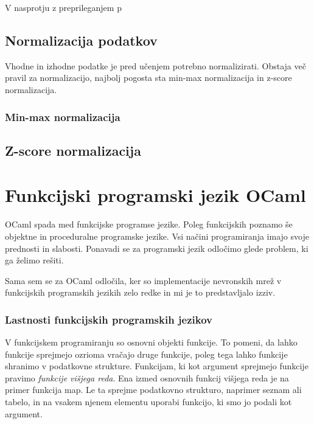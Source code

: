 \documentclass[mat1]{fmfdelo}
\begin{document}
V nasprotju z preprileganjem p
%
%
%
\subsection{Normalizacija podatkov}
Vhodne in izhodne podatke je pred učenjem potrebno normalizirati. Obstaja več pravil za normalizacijo, najbolj pogosta sta min-max normalizacija in z-score normalizacija.
%
\subsubsection{Min-max normalizacija}

%
\subsection{Z-score normalizacija}
%
\section{Funkcijski programski jezik OCaml}
OCaml spada med funkcijske programse jezike. Poleg funkcijskih poznamo še objektne in proceduralne programske jezike. Vsi načini programiranja imajo svoje prednosti in slabosti. Ponavadi se za programski jezik odločimo glede problem, ki ga želimo rešiti. 

Sama sem se za OCaml odločila, ker so implementacije nevronskih mrež v funkcijskih programskih jezikih zelo redke in mi je to predstavljalo izziv. 
%
\subsubsection{Lastnosti funkcijskih programskih jezikov}
V funkcijskem programiranju so osnovni objekti funkcije. To pomeni, da lahko funkcije sprejmejo ozrioma vračajo druge funkcije, poleg tega lahko funkcije shranimo v podatkovne strukture. Funkcijam, ki kot argument sprejmejo funkcije pravimo \emph{funkcije višjega reda}. Ena izmed osnovnih funkcij višjega reda je na primer funkcija map. Le ta sprejme podatkovno strukturo, naprimer seznam ali tabelo, in na vsakem njenem elementu uporabi funkcijo, ki smo jo podali kot argument.
\end{document}
